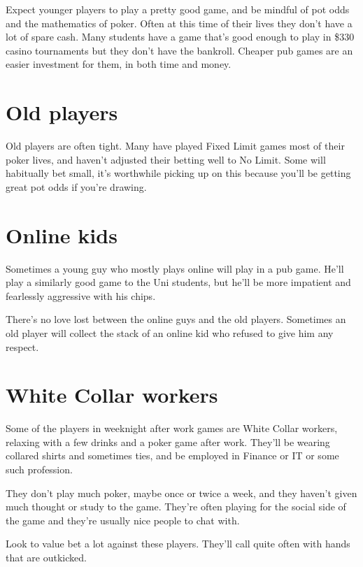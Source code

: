 Expect younger players to play a pretty good game, and be mindful of pot
odds and the mathematics of poker. Often at this time of their lives
they don't have a lot of spare cash. Many students have a game that's
good enough to play in \$330 casino tournaments but they don't have
the bankroll. Cheaper pub games are an easier investment for them,
in both time and money.

\section{Old players}

Old players are often tight. Many have played Fixed Limit games most
of their poker lives, and haven't adjusted their betting well to No
Limit. Some will habitually bet small, it's worthwhile picking up on
this because you'll be getting great pot odds if you're drawing.

\section{Online kids}

Sometimes a young guy who mostly plays online will play in a pub game.
He'll play a similarly good game to the Uni students, but he'll be
more impatient and fearlessly aggressive with his chips.

There's no love lost between the online guys and the old players. Sometimes
an old player will collect the stack of an online kid who refused to
give him any respect.

\section{White Collar workers}

Some of the players in weeknight after work games are White
Collar workers, relaxing with a few drinks and a poker game after work.
They'll be wearing collared shirts and sometimes ties, and be employed
in Finance or IT or some such profession.

They don't play much poker, maybe once or twice a week, and they haven't
given much thought or study to the game. They're often playing for the
social side of the game and they're usually nice people to chat with.

Look to value bet a lot against these players. They'll call quite often
with hands that are outkicked.


